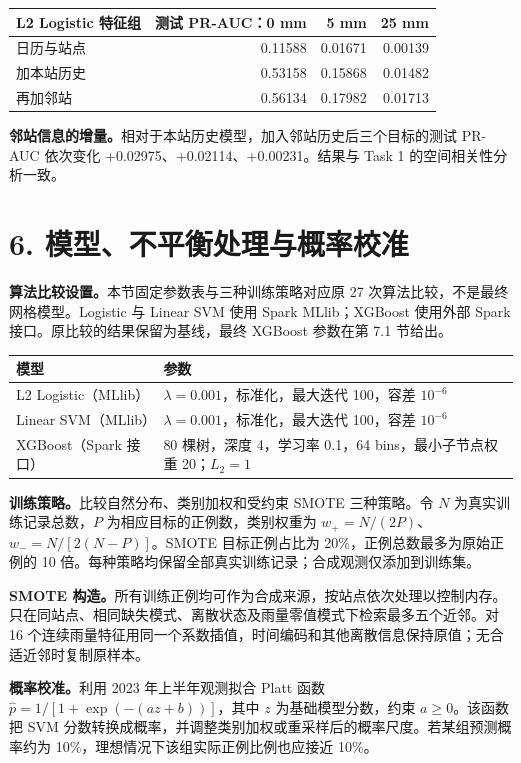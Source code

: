 \documentclass[UTF8,fontset=fandol,10pt,a4paper,landscape]{ctexart}
\begin{document}
\begin{center}\begin{tabular}{lrrr}\toprule
L2 Logistic 特征组 & 测试 PR-AUC：0 mm & 5 mm & 25 mm\\\midrule
日历与站点 & 0.11588 & 0.01671 & 0.00139\\
加本站历史 & 0.53158 & 0.15868 & 0.01482\\
再加邻站 & 0.56134 & 0.17982 & 0.01713\\
\bottomrule\end{tabular}\end{center}

\textbf{邻站信息的增量。}相对于本站历史模型，加入邻站历史后三个目标的测试 PR-AUC 依次变化 +0.02975、+0.02114、+0.00231。结果与 Task 1 的空间相关性分析一致。

\endgroup
\clearpage\section*{6. 模型、不平衡处理与概率校准}
\textbf{算法比较设置。}本节固定参数表与三种训练策略对应原 27 次算法比较，不是最终网格模型。Logistic 与 Linear SVM 使用 Spark MLlib；XGBoost 使用外部 Spark 接口。原比较的结果保留为基线，最终 XGBoost 参数在第 7.1 节给出。
\begin{center}\begin{tabular}{p{6cm}p{17cm}}\toprule
模型 & 参数\\\midrule
L2 Logistic（MLlib） & $\lambda=0.001$，标准化，最大迭代 100，容差 $10^{-6}$\\
Linear SVM（MLlib） & $\lambda=0.001$，标准化，最大迭代 100，容差 $10^{-6}$\\
XGBoost（Spark 接口） & 80 棵树，深度 4，学习率 0.1，64 bins，最小子节点权重 20；$L_2=1$\\
\bottomrule\end{tabular}\end{center}

\textbf{训练策略。}比较自然分布、类别加权和受约束 SMOTE 三种策略。令 $N$ 为真实训练记录总数，$P$ 为相应目标的正例数，类别权重为 $w_+=N/(2P)$、$w_-=N/[2(N-P)]$。SMOTE 目标正例占比为 20\%，正例总数最多为原始正例的 10 倍。每种策略均保留全部真实训练记录；合成观测仅添加到训练集。

\textbf{SMOTE 构造。}所有训练正例均可作为合成来源，按站点依次处理以控制内存。只在同站点、相同缺失模式、离散状态及雨量零值模式下检索最多五个近邻。对 16 个连续雨量特征用同一个系数插值，时间编码和其他离散信息保持原值；无合适近邻时复制原样本。

\textbf{概率校准。}利用 2023 年上半年观测拟合 Platt 函数 $\hat p=1/[1+\exp(-(az+b))]$，其中 $z$ 为基础模型分数，约束 $a\geq0$。该函数把 SVM 分数转换成概率，并调整类别加权或重采样后的概率尺度。若某组预测概率约为 10\%，理想情况下该组实际正例比例也应接近 10\%。
\end{document}
